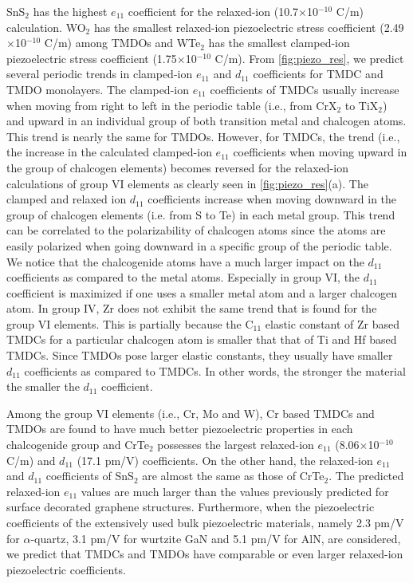 SnS$_2$ has the highest $e_{11}$ coefficient for the relaxed-ion (10.7$\times$10$^{-10}$ C/m) calculation. WO$_2$ has the smallest relaxed-ion piezoelectric stress coefficient (2.49$\times$10$^{-10}$ C/m) among TMDOs and WTe$_2$ has the smallest clamped-ion piezoelectric stress coefficient (1.75$\times$10$^{-10}$ C/m). From \autoref{fig:piezo_res}, we predict several  periodic trends in clamped-ion $e_{11}$ and $d_{11}$ coefficients for TMDC and TMDO monolayers. The clamped-ion $e_{11}$ coefficients of TMDCs usually increase when moving from right to left in the periodic table (i.e., from CrX$_{2}$ to TiX$_{2}$) and upward in an individual group of both transition metal and chalcogen atoms.  This trend is nearly the same for TMDOs. However, for TMDCs, the trend (i.e., the increase in the calculated clamped-ion $e_{11}$ coefficients when moving upward in the group of chalcogen elements) becomes reversed for the relaxed-ion calculations of group VI elements  as clearly seen in \autoref{fig:piezo_res}(a). 
The clamped and relaxed ion $d_{11}$ coefficients increase when moving downward in the group of chalcogen elements (i.e. from S to Te) in each metal group.  This trend can be correlated to the polarizability of chalcogen atoms since the atoms are easily polarized when going downward in a specific group of the periodic table.  We notice that the chalcogenide atoms have a much larger impact on the $d_{11}$ coefficients as compared to the metal atoms.  Especially in group VI, the $d_{11}$ coefficient is maximized if one uses a smaller metal atom and a larger chalcogen atom. In group IV, Zr does not exhibit the same trend that is found for the group VI elements. This is partially because the C$_{11}$ elastic constant of Zr based TMDCs for a particular chalcogen atom is smaller that that of Ti and Hf based TMDCs. Since TMDOs pose larger elastic constants, they usually have smaller $d_{11}$ coefficients as compared to TMDCs. In other words, the stronger the material the smaller the $d_{11}$ coefficient.  

Among the group VI elements (i.e., Cr, Mo and W), Cr based TMDCs and TMDOs are found to have much better piezoelectric properties in each chalcogenide group and CrTe$_2$ possesses the largest relaxed-ion  $e_{11}$ (8.06$\times$10$^{-10}$ C/m) and $d_{11}$ (17.1 pm/V) coefficients. On the other hand, the relaxed-ion $e_{11}$ and $d_{11}$ coefficients of SnS$_{2}$ are  almost the same as those of CrTe$_2$. The predicted relaxed-ion $e_{11}$ values are much larger than the values previously predicted for surface decorated graphene structures\cite{Ong2012}. Furthermore, when the piezoelectric coefficients of the extensively used bulk piezoelectric materials, namely 2.3 pm/V for  $\alpha$-quartz\cite{Bechmann1958}, 3.1 pm/V for wurtzite GaN\cite{Lueng2000} and 5.1 pm/V for AlN\cite{Lueng2000}, are considered, we predict that TMDCs and TMDOs have comparable or even larger relaxed-ion piezoelectric coefficients.

